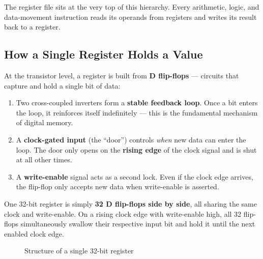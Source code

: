 \documentclass[12pt,a4paper]{article}
\begin{document}
The register file sits at the very top of this hierarchy. Every arithmetic, logic, and data-movement instruction reads its operands from registers and writes its result back to a register.

\subsection{How a Single Register Holds a Value}

At the transistor level, a register is built from \textbf{D flip-flops} — circuits that capture and hold a single bit of data:

\begin{enumerate}
    \item Two cross-coupled inverters form a \textbf{stable feedback loop}. Once a bit enters the loop, it reinforces itself indefinitely — this is the fundamental mechanism of digital memory.
    \item A \textbf{clock-gated input} (the ``door'') controls \emph{when} new data can enter the loop. The door only opens on the \textbf{rising edge} of the clock signal and is shut at all other times.
    \item A \textbf{write-enable} signal acts as a second lock. Even if the clock edge arrives, the flip-flop only accepts new data when write-enable is asserted.
\end{enumerate}

One 32-bit register is simply \textbf{32 D flip-flops side by side}, all sharing the same clock and write-enable. On a rising clock edge with write-enable high, all 32 flip-flops simultaneously swallow their respective input bit and hold it until the next enabled clock edge.

\begin{figure}[H]
    \centering
    \caption{Structure of a single 32-bit register}
\end{figure}
\end{document}
